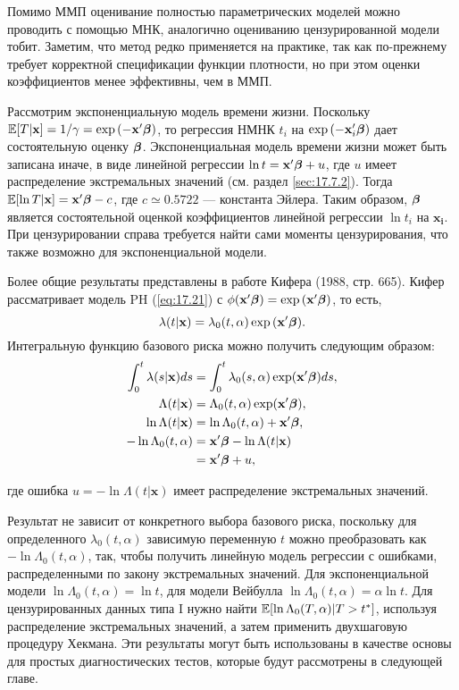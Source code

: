\noindent
Помимо ММП оценивание полностью параметрических моделей можно проводить с помощью МНК, аналогично оцениванию цензурированной модели тобит. Заметим, что метод редко применяется на практике, так как по-прежнему требует корректной спецификации функции плотности, но при этом оценки коэффициентов менее эффективны, чем в ММП.

Рассмотрим экспоненциальную модель времени жизни. Поскольку $\mathbb{E}[T|\mathbf{x}]=1/\gamma=\exp{(-\mathbf{x}'\bm{\beta})}$, то регрессия НМНК $t_i$ на $\exp{(-\mathbf{x}_i'\bm{\beta})}$ дает состоятельную оценку $\bm{\beta}$. Экспоненциальная модель времени жизни может быть записана иначе, в виде линейной регрессии $\ln t=\mathbf{x}'\bm{\beta}+u$, где $u$ имеет распределение экстремальных значений (см. раздел \ref{sec:17.7.2}). Тогда $\mathbb{E}[\ln T|\mathbf{x}]=\mathbf{x}'\bm{\beta}-c$, где $c \simeq 0.5722$ --- константа Эйлера. Таким образом, $\bm{\beta}$ является состоятельной оценкой коэффициентов линейной регрессии $\ln t_i$ на $\mathbf{x_i}$. При цензурировании справа требуется найти сами моменты цензурирования, что также возможно для экспоненциальной модели.

Более общие результаты представлены в работе Кифера (1988, стр. 665). Кифер рассматривает модель PH (\ref{eq:17.21}) с $\phi(\mathbf{x}'\bm{\beta})=\exp{(\mathbf{x}'\bm{\beta})}$, то есть,
        $$\lambda(t|\mathbf{x})=\lambda_0(t,\alpha)\exp{(\mathbf{x}'\bm{\beta})}.$$
Интегральную функцию базового риска можно получить следующим образом:
        \begin{align}
        \label{eq:17.20}
        \int^{t}_{0}\lambda(s|\mathbf{x})ds&=\int^{t}_{0}\lambda_0(s,\alpha)\exp(\mathbf{x}'\bm{\beta})ds,\\
        \Lambda(t|\mathbf{x})&=\Lambda_0(t,\alpha)\exp(\mathbf{x}'\bm{\beta}),\notag\\
        \ln\Lambda(t|\mathbf{x})&=\ln\Lambda_0(t,\alpha)+\mathbf{x}'\bm{\beta},\notag\\
        -\ln\Lambda_0(t,\alpha)&=\mathbf{x}'\bm{\beta}-\ln\Lambda(t|\mathbf{x})\notag\\
        &=\mathbf{x}'\bm{\beta}+u,\notag
        \end{align}

где ошибка $u=-\ln\Lambda(t|\mathbf{x})$ имеет распределение экстремальных значений.


Результат не зависит от конкретного выбора базового риска, поскольку для определенного $\lambda_0(t,\alpha)$ зависимую переменную $t$ можно преобразовать как $-\ln\Lambda_0(t,\alpha)$, так, чтобы получить линейную модель регрессии с ошибками, распределенными по закону экстремальных значений. %
Для экспоненциальной модели $\ln\Lambda_0(t,\alpha)=\ln t$, для модели Вейбулла $\ln\Lambda_0(t,\alpha)=\alpha\ln t$. Для цензурированных данных типа I нужно найти $\mathbb{E}[\ln\Lambda_0(T,\alpha)|T>t^*]$, используя распределение экстремальных значений, а затем применить двухшаговую процедуру Хекмана. Эти результаты могут быть использованы в качестве основы для простых диагностических тестов, которые будут рассмотрены в следующей главе.






